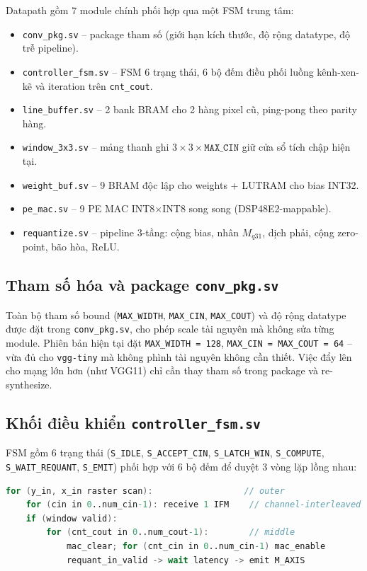 Datapath gồm 7 module chính phối hợp qua một FSM trung tâm:
\begin{itemize}
    \item \texttt{conv\_pkg.sv} -- package tham số (giới hạn kích thước, độ rộng datatype, độ trễ pipeline).
    \item \texttt{controller\_fsm.sv} -- FSM 6 trạng thái, 6 bộ đếm điều phối luồng kênh-xen-kẽ và iteration trên \texttt{cnt\_cout}.
    \item \texttt{line\_buffer.sv} -- 2 bank BRAM cho 2 hàng pixel cũ, ping-pong theo parity hàng.
    \item \texttt{window\_3x3.sv} -- mảng thanh ghi $3 \times 3 \times \texttt{MAX\_CIN}$ giữ cửa sổ tích chập hiện tại.
    \item \texttt{weight\_buf.sv} -- 9 BRAM độc lập cho weights + LUTRAM cho bias INT32.
    \item \texttt{pe\_mac.sv} -- 9 PE MAC INT8$\times$INT8 song song (DSP48E2-mappable).
    \item \texttt{requantize.sv} -- pipeline 3-tầng: cộng bias, nhân $M_{q31}$, dịch phải, cộng zero-point, bão hòa, ReLU.
\end{itemize}

\subsection{Tham số hóa và package \texttt{conv\_pkg.sv}}
Toàn bộ tham số bound (\texttt{MAX\_WIDTH}, \texttt{MAX\_CIN}, \texttt{MAX\_COUT}) và độ rộng datatype được đặt trong \texttt{conv\_pkg.sv}, cho phép scale tài nguyên mà không sửa từng module. Phiên bản hiện tại đặt \texttt{MAX\_WIDTH = 128}, \texttt{MAX\_CIN = MAX\_COUT = 64} -- vừa đủ cho \texttt{vgg-tiny} mà không phình tài nguyên không cần thiết. Việc đẩy lên cho mạng lớn hơn (như VGG11) chỉ cần thay tham số trong package và re-synthesize.

\subsection{Khối điều khiển \texttt{controller\_fsm.sv}}
FSM gồm 6 trạng thái (\texttt{S\_IDLE}, \texttt{S\_ACCEPT\_CIN}, \texttt{S\_LATCH\_WIN}, \texttt{S\_COMPUTE}, \texttt{S\_WAIT\_REQUANT}, \texttt{S\_EMIT}) phối hợp với 6 bộ đếm để duyệt 3 vòng lặp lồng nhau:

\begin{lstlisting}[language=Verilog, caption={Trình tự duyệt 3 vòng lặp trong controller FSM}, label={lst:fsm}]
for (y_in, x_in raster scan):                  // outer
    for (cin in 0..num_cin-1): receive 1 IFM    // channel-interleaved
    if (window valid):
        for (cnt_cout in 0..num_cout-1):        // middle
            mac_clear; for (cnt_cin in 0..num_cin-1) mac_enable
            requant_in_valid -> wait latency -> emit M_AXIS
\end{lstlisting}

